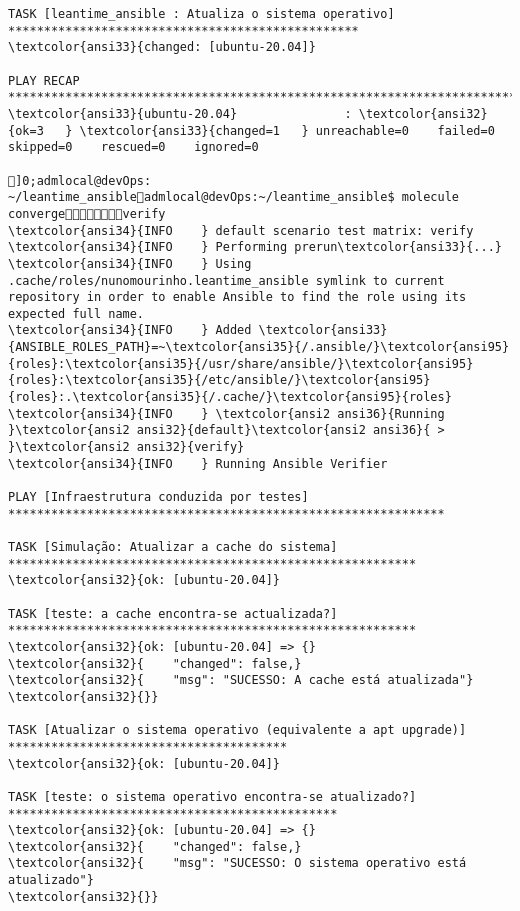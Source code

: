 \documentclass{scrartcl}
\begin{document}
\begin{Verbatim}
TASK [leantime_ansible : Atualiza o sistema operativo] *************************************************
\textcolor{ansi33}{changed: [ubuntu-20.04]}

PLAY RECAP *********************************************************************************************
\textcolor{ansi33}{ubuntu-20.04}               : \textcolor{ansi32}{ok=3   } \textcolor{ansi33}{changed=1   } unreachable=0    failed=0    skipped=0    rescued=0    ignored=0

]0;admlocal@devOps: ~/leantime_ansibleadmlocal@devOps:~/leantime_ansible$ molecule convergeverify
\textcolor{ansi34}{INFO    } default scenario test matrix: verify
\textcolor{ansi34}{INFO    } Performing prerun\textcolor{ansi33}{...}
\textcolor{ansi34}{INFO    } Using .cache/roles/nunomourinho.leantime_ansible symlink to current repository in order to enable Ansible to find the role using its expected full name.
\textcolor{ansi34}{INFO    } Added \textcolor{ansi33}{ANSIBLE_ROLES_PATH}=~\textcolor{ansi35}{/.ansible/}\textcolor{ansi95}{roles}:\textcolor{ansi35}{/usr/share/ansible/}\textcolor{ansi95}{roles}:\textcolor{ansi35}{/etc/ansible/}\textcolor{ansi95}{roles}:.\textcolor{ansi35}{/.cache/}\textcolor{ansi95}{roles}
\textcolor{ansi34}{INFO    } \textcolor{ansi2 ansi36}{Running }\textcolor{ansi2 ansi32}{default}\textcolor{ansi2 ansi36}{ > }\textcolor{ansi2 ansi32}{verify}
\textcolor{ansi34}{INFO    } Running Ansible Verifier

PLAY [Infraestrutura conduzida por testes] *************************************************************

TASK [Simulação: Atualizar a cache do sistema] *********************************************************
\textcolor{ansi32}{ok: [ubuntu-20.04]}

TASK [teste: a cache encontra-se actualizada?] *********************************************************
\textcolor{ansi32}{ok: [ubuntu-20.04] => {}
\textcolor{ansi32}{    "changed": false,}
\textcolor{ansi32}{    "msg": "SUCESSO: A cache está atualizada"}
\textcolor{ansi32}{}}

TASK [Atualizar o sistema operativo (equivalente a apt upgrade)] ***************************************
\textcolor{ansi32}{ok: [ubuntu-20.04]}

TASK [teste: o sistema operativo encontra-se atualizado?] **********************************************
\textcolor{ansi32}{ok: [ubuntu-20.04] => {}
\textcolor{ansi32}{    "changed": false,}
\textcolor{ansi32}{    "msg": "SUCESSO: O sistema operativo está atualizado"}
\textcolor{ansi32}{}}


\end{Verbatim}
\end{document}
